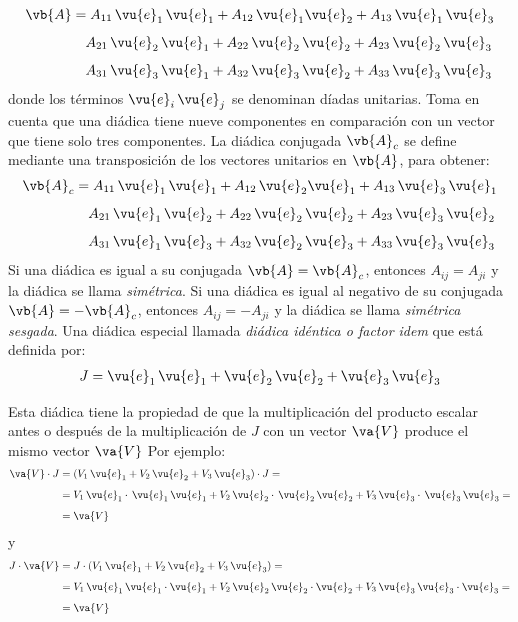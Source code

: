 \begin{align*}
\vb{A} &= A_{11} \, \vu{e}_{1} \, \vu{e}_{1} + A_{12} \, \vu{e}_{1} \vu{e}_{2} + A_{13} \, \vu{e}_{1} \, \vu{e}_{3} \\[0.5em]  
&{\quad} A_{21} \, \vu{e}_{2} \, \vu{e}_{1} + A_{22} \, \vu{e}_{2} \, \vu{e}_{2} + A_{23} \, \vu{e}_{2} \, \vu{e}_{3} \\[0.5em]
&{\quad} A_{31} \, \vu{e}_{3} \, \vu{e}_{1} + A_{32} \, \vu{e}_{3} \, \vu{e}_{2} + A_{33} \, \vu{e}_{3} \, \vu{e}_{3}    
\end{align*}
donde los términos $\vu{e}_{i} \, \vu{e}_{j}$ se denominan díadas unitarias. Toma en cuenta que una diádica tiene nueve componentes en comparación con un vector que tiene solo tres componentes. La diádica conjugada $\vb{A}_{c}$ se define mediante una transposición de los vectores unitarios en $\vb{A}$, para obtener:
\begin{align*}
\vb{A}_{c} &= A_{11} \, \vu{e}_{1} \, \vu{e}_{1} + A_{12} \, \vu{e}_{2} \vu{e}_{1} + A_{13} \, \vu{e}_{3} \, \vu{e}_{1} \\[0.5em]  
&{\quad} A_{21} \, \vu{e}_{1} \, \vu{e}_{2} + A_{22} \, \vu{e}_{2} \, \vu{e}_{2} + A_{23} \, \vu{e}_{3} \, \vu{e}_{2} \\[0.5em]
&{\quad} A_{31} \, \vu{e}_{1} \, \vu{e}_{3} + A_{32} \, \vu{e}_{2} \, \vu{e}_{3} + A_{33} \, \vu{e}_{3} \, \vu{e}_{3}    
\end{align*}
Si una diádica es igual a su conjugada $\vb{A} = \vb{A}_{c}$, entonces $A_{ij} = A_{ji}$ y la diádica se llama \emph{simétrica}. Si una diádica es igual al negativo de su conjugada $\vb{A} = - \vb{A}_{c}$, entonces $A_{ij} = - A_{ji}$ y la diádica se llama \emph{simétrica sesgada}. Una diádica especial llamada \emph{diádica idéntica o factor idem} que está definida por:
\begin{align*}
J = \vu{e}_{1} \, \vu{e}_{1} + \vu{e}_{2} \, \vu{e}_{2} + \vu{e}_{3} \, \vu{e}_{3}
\end{align*}

Esta diádica tiene la propiedad de que la multiplicación del producto escalar antes o después de la multiplicación de $J$ con un vector $\va{V}$ produce el mismo vector $\va{V}$ Por ejemplo:
\begin{align*}
\va{V} \cdot J &= ( V_{1} \, \vu{e}_{1} + V_{2} \, \vu{e}_{2} + V_{3}  \, \vu{e}_{3} ) \cdot J = \\[0.5em]
&= V_{1} \, \vu{e}_{1} \cdot \, \vu{e}_{1} \, \vu{e}_{1} + V_{2} \, \vu{e}_{2} \cdot \,\vu{e}_{2} \, \vu{e}_{2} + V_{3} \,\vu{e}_{3} \cdot \, \vu{e}_{3} \, \vu{e}_{3} = \\[0.5em]
&= \va{V}
\end{align*}
y
\begin{align*}
J \cdot \va{V} &= J \cdot (V_{1} \, \vu{e}_{1} + V_{2} \, \vu{e}_{2} + V_{3} \, \vu{e}_{3}) = \\[0.5em]
&= V_{1} \, \vu{e}_{1} \, \vu{e}_{1} \cdot \vu{e}_{1} + V_{2} \, \vu{e}_{2} \, \vu{e}_{2} \cdot \vu{e}_{2} + V_{3} \, \vu{e}_{3} \, \vu{e}_{3} \cdot \vu{e}_{3} = \\[0.5em]
&= \va{V}
\end{align*}

